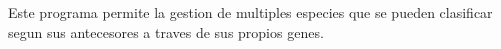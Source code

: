Este programa permite la gestion de multiples especies que se pueden clasificar segun sus antecesores a traves de sus propios genes. 